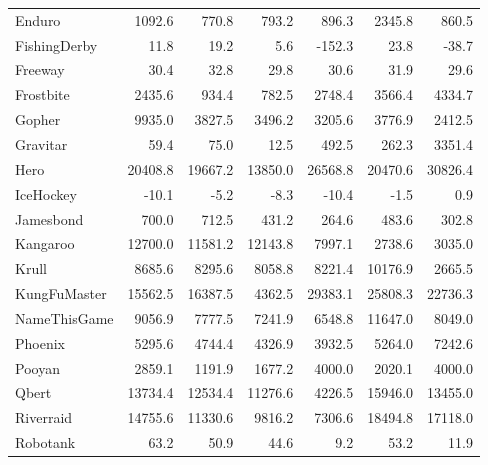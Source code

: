 \begin{table}[t]
{\begin{tabular}{l@{}rrrrrr}
Enduro         &      1092.6 &     770.8 &      793.2 &           896.3 &             2345.8 &    860.5 \\
FishingDerby   &        11.8 &      19.2 &        5.6 &          -152.3 &               23.8 &    -38.7 \\
Freeway        &        30.4 &      32.8 &       29.8 &            30.6 &               31.9 &     29.6 \\
Frostbite      &      2435.6 &     934.4 &      782.5 &          2748.4 &             3566.4 &   4334.7 \\
Gopher         &      9935.0 &    3827.5 &     3496.2 &          3205.6 &             3776.9 &   2412.5 \\
Gravitar       &        59.4 &      75.0 &       12.5 &           492.5 &              262.3 &   3351.4 \\
Hero           &     20408.8 &   19667.2 &    13850.0 &         26568.8 &            20470.6 &  30826.4 \\
IceHockey      &       -10.1 &      -5.2 &       -8.3 &           -10.4 &               -1.5 &      0.9 \\
Jamesbond      &       700.0 &     712.5 &      431.2 &           264.6 &              483.6 &    302.8 \\
Kangaroo       &     12700.0 &   11581.2 &    12143.8 &          7997.1 &             2738.6 &   3035.0 \\
Krull          &      8685.6 &    8295.6 &     8058.8 &          8221.4 &            10176.9 &   2665.5 \\
KungFuMaster   &     15562.5 &   16387.5 &     4362.5 &         29383.1 &            25808.3 &  22736.3 \\
NameThisGame   &      9056.9 &    7777.5 &     7241.9 &          6548.8 &            11647.0 &   8049.0 \\
Phoenix        &      5295.6 &    4744.4 &     4326.9 &          3932.5 &             5264.0 &   7242.6 \\
Pooyan         &      2859.1 &    1191.9 &     1677.2 &          4000.0 &             2020.1 &   4000.0 \\
Qbert          &     13734.4 &   12534.4 &    11276.6 &          4226.5 &            15946.0 &  13455.0 \\
Riverraid      &     14755.6 &   11330.6 &     9816.2 &          7306.6 &            18494.8 &  17118.0 \\
Robotank       &        63.2 &      50.9 &       44.6 &             9.2 &               53.2 &     11.9 \\

\end{tabular}}
\end{table}

